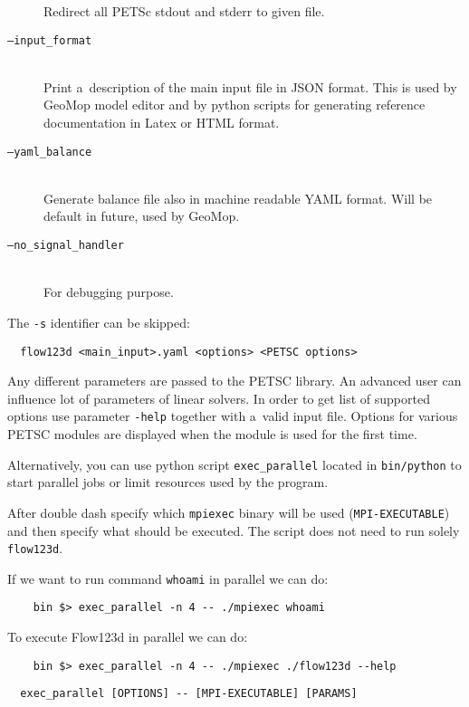 \begin{description}
        Redirect all PETSc stdout and stderr to given file.
 \item[{\tt --input\_format}] \hfill\\
        Print a~description of the main input file in JSON format.
        This is used by GeoMop model editor and by python scripts for
        generating reference documentation in Latex or HTML format.
 \item[{\tt --yaml\_balance}] \hfill\\
        Generate balance file also in machine readable YAML format. Will be default in future, used by GeoMop.
 \item[{\tt --no\_signal\_handler}] \hfill\\
        For debugging purpose.
\end{description}

The {\tt -s} identifier can be skipped:
\begin{verbatim}
  flow123d <main_input>.yaml <options> <PETSC options>
\end{verbatim}

Any different parameters are passed to the PETSC library. An advanced user can influence lot of parameters of linear solvers. In order to get list of supported options
use parameter \verb'-help' together with a~valid input file. Options for various PETSC modules are displayed when the module is used for the first time.

Alternatively, you can use python script \verb'exec_parallel' located in \verb'bin/python' to start parallel jobs or limit resources used by the program.

After double dash specify which \verb'mpiexec' binary will be used (\verb'MPI-EXECUTABLE') and then specify what should be executed.
The script does not need to run solely \verb'flow123d'.

If we want to run command \verb'whoami' in parallel we can do:
\begin{verbatim}
	bin $> exec_parallel -n 4 -- ./mpiexec whoami
\end{verbatim}

To execute Flow123d in parallel we can do:
\begin{verbatim}
	bin $> exec_parallel -n 4 -- ./mpiexec ./flow123d --help
\end{verbatim}


\begin{verbatim}
  exec_parallel [OPTIONS] -- [MPI-EXECUTABLE] [PARAMS]
\end{verbatim}

